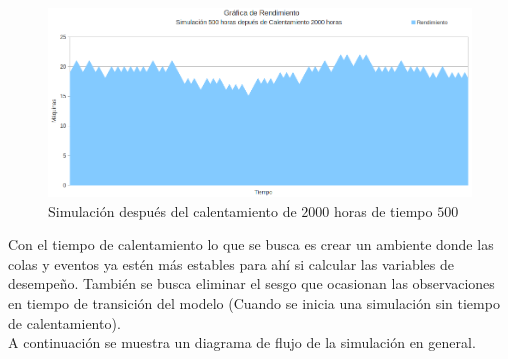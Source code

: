 \documentclass[12pt]{article}
\begin{document}
\begin{figure}
  \centering
	\includegraphics[scale=0.4]{graf4.png} 
  \caption{Simulaci\'on despu\'es del calentamiento de $2000$ horas de tiempo $500$}
  \label{fig:cal2}
\end{figure}

\newpage



Con el tiempo de calentamiento lo que se busca es crear un ambiente donde las colas y eventos ya estén más estables para ahí si calcular las variables de desempeño. También se busca eliminar el sesgo que ocasionan las observaciones en tiempo de transición del modelo (Cuando se inicia una simulación sin tiempo de calentamiento). \\


A continuación se muestra un diagrama de flujo de la simulación en general.\\
\end{document}
